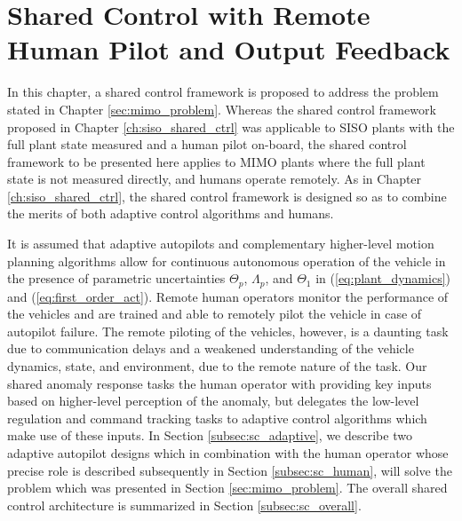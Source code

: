 \chapter{Shared Control with Remote Human Pilot and Output Feedback}  \label{ch:mimo_shared_ctrl}
In this chapter, a shared control framework is proposed to address the problem stated in Chapter \ref{sec:mimo_problem}. Whereas the shared control framework proposed in Chapter \ref{ch:siso_shared_ctrl} was applicable to SISO plants with the full plant state measured and a human pilot on-board, the shared control framework to be presented here applies to MIMO plants where the full plant state is not measured directly, and humans operate remotely. As in Chapter \ref{ch:siso_shared_ctrl}, the shared control framework is designed so as to combine the merits of both adaptive control algorithms and humans. 

It is assumed that adaptive autopilots and complementary higher-level motion planning algorithms allow for continuous autonomous operation of the vehicle in the presence of parametric uncertainties $\Theta_p$, $\Lambda_p$, and $\Theta_1$ in (\ref{eq:plant_dynamics}) and (\ref{eq:first_order_act}). Remote human operators monitor the performance of the vehicles and are trained and able to remotely pilot the vehicle in case of autopilot failure. The remote piloting of the vehicles, however, is a daunting task due to communication delays and a weakened understanding of the vehicle dynamics, state, and environment, due to the remote nature of the task. Our shared anomaly response tasks the human operator with providing key inputs based on higher-level perception of the anomaly, but delegates the low-level regulation and command tracking tasks to adaptive control algorithms which make use of these inputs. In Section \ref{subsec:sc_adaptive}, we describe two adaptive autopilot designs which in combination with the human operator whose precise role is described subsequently in Section \ref{subsec:sc_human}, will solve the problem which was presented in Section \ref{sec:mimo_problem}. The overall shared control architecture is summarized in Section \ref{subsec:sc_overall}.

